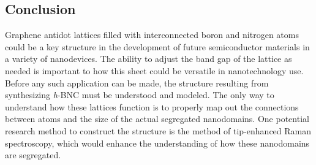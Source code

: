 \documentclass[11pt]{article}
\begin{document}
\begin{multicols}{2}
\section{\textbf{Conclusion}}
Graphene antidot lattices filled with interconnected boron and nitrogen atoms could be a key structure in the development of future semiconductor materials in a variety of nanodevices. The ability to adjust the band gap of the lattice as needed is important to how this sheet could be versatile in nanotechnology use. Before any such application can be made, the structure resulting from synthesizing \textit{h}-BNC must be understood and modeled. The only way to understand how these lattices function is to properly map out the connections between atoms and the size of the actual segregated nanodomains. One potential research method to construct the structure is the method of tip-enhanced Raman spectroscopy, which would enhance the understanding of how these nanodomains are segregated.





\end{multicols}
\end{document}
